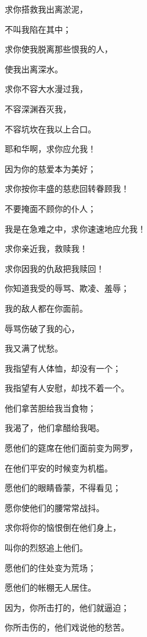 {\par }{\Q {}求你搭救我出离淤泥，
\par }{\Q 不叫我陷在其中；
\par }{\Q 求你使我脱离那些恨我的人，
\par }{\Q 使我出离深水。
\par }{\Q {}求你不容大水漫过我，
\par }{\Q 不容深渊吞灭我，
\par }{\Q 不容坑坎在我以上合口。
\par }{\BB \par }{\Q {}耶和华啊，求你应允我！
\par }{\Q 因为你的慈爱本为美好；
\par }{\Q 求你按你丰盛的慈悲回转眷顾我！
\par }{\Q {}不要掩面不顾你的仆人；
\par }{\Q 我是在急难之中，求你速速地应允我！
\par }{\Q {}求你亲近我，救赎我！
\par }{\Q 求你因我的仇敌把我赎回！
\par }{\BB \par }{\Q {}你知道我受的辱骂、欺凌、羞辱；
\par }{\Q 我的敌人都在你面前。
\par }{\Q {}辱骂伤破了我的心，
\par }{\Q 我又满了忧愁。
\par }{\Q 我指望有人体恤，却没有一个；
\par }{\Q 我指望有人安慰，却找不着一个。
\par }{\Q {}他们拿苦胆给我当食物；
\par }{\Q 我渴了，他们拿醋给我喝。
\par }{\BB \par }{\Q {}愿他们的筵席在他们面前变为网罗，
\par }{\Q 在他们平安的时候变为机槛。
\par }{\Q {}愿他们的眼睛昏蒙，不得看见；
\par }{\Q 愿你使他们的腰常常战抖。
\par }{\Q {}求你将你的恼恨倒在他们身上，
\par }{\Q 叫你的烈怒追上他们。
\par }{\Q {}愿他们的住处变为荒场；
\par }{\Q 愿他们的帐棚无人居住。
\par }{\Q {}因为，你所击打的，他们就逼迫；
\par }{\Q 你所击伤的，他们戏说他的愁苦。
}
